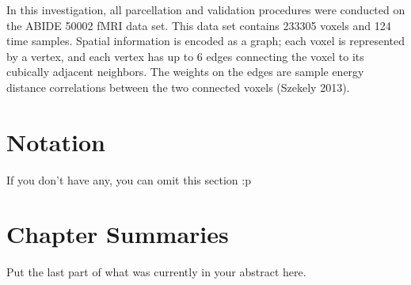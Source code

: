 In this investigation, all parcellation and validation procedures were
conducted on the ABIDE 50002 fMRI data set. This data set contains
233305 voxels and 124 time samples. Spatial information is encoded as a
graph; each voxel is represented by a vertex, and each vertex has up to
6 edges connecting the voxel to its cubically adjacent neighbors. The
weights on the edges are sample energy distance correlations between the
two connected voxels (Szekely 2013).

\section{Notation}
{\color{red}If you don't have any, you can omit this section :p}

\section{Chapter Summaries}
{\color{red}Put the last part of what was currently in your abstract
here.}

